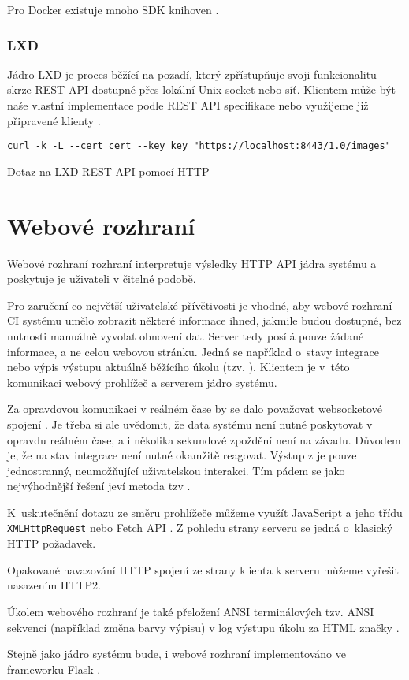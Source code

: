 Pro Docker existuje mnoho SDK knihoven \cite{docker_sdk}.

\subsubsection{LXD}

Jádro LXD je proces běžící na pozadí, který zpřístupňuje svoji funkcionalitu skrze REST API dostupné přes lokální Unix socket nebo síť.
Klientem může být naše vlastní implementace podle REST API specifikace nebo využijeme již připravené klienty \cite{lxd_rest}.

\begin{listing}[ht]
\begin{verbatim}
curl -k -L --cert cert --key key "https://localhost:8443/1.0/images"
\end{verbatim}
\caption{Dotaz na LXD REST API pomocí HTTP}
\end{listing}

\section{Webové rozhraní}

Webové rozhraní rozhraní interpretuje výsledky HTTP API jádra systému a poskytuje je uživateli v čitelné podobě.

Pro zaručení co největší uživatelské přívětivosti je vhodné, aby webové rozhraní CI systému umělo zobrazit některé informace ihned, jakmile budou dostupné, bez nutnosti manuálně vyvolat obnovení dat.
Server tedy posílá pouze žádané informace, a ne celou webovou stránku.
Jedná se například o~stavy integrace nebo výpis výstupu aktuálně běžícího úkolu (tzv. ).
Klientem je v~této komunikaci webový prohlížeč a serverem jádro systému.

Za opravdovou komunikaci v reálném čase by se dalo považovat websocketové spojení \cite{websocket}.
Je třeba si ale uvědomit, že data systému není nutné poskytovat v opravdu reálném čase, a i několika sekundové zpoždění není na závadu.
Důvodem je, že na stav integrace není nutné okamžitě reagovat. 
Výstup z  je pouze jednostranný, neumožňující uživatelskou interakci.
Tím pádem se jako nejvýhodnější řešení jeví metoda tzv .

K~uskutečnění dotazu ze směru prohlížeče můžeme využít JavaScript a jeho třídu \verb|XMLHttpRequest| nebo Fetch API \cite{fetch_api}.
Z pohledu strany serveru se jedná o~klasický HTTP požadavek.

Opakované navazování HTTP spojení ze strany klienta k serveru můžeme vyřešit nasazením HTTP2.

Úkolem webového rozhraní je také přeložení ANSI terminálových tzv. ANSI  sekvencí (například změna barvy výpisu) v log výstupu úkolu za HTML značky \cite{ansi_up}.

Stejně jako jádro systému bude, i webové rozhraní implementováno ve frameworku Flask \cite{flask}.



